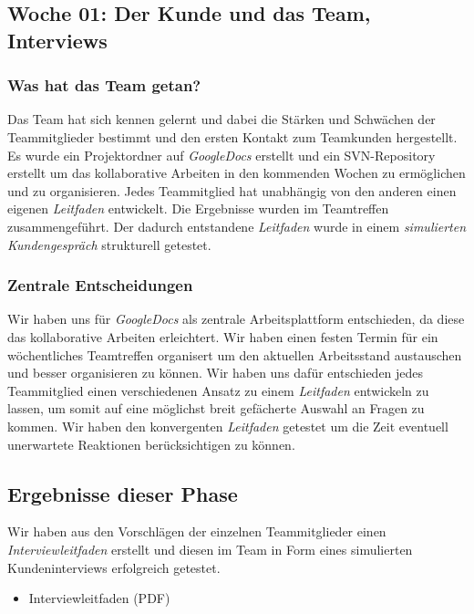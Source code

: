 \documentclass{article}
\begin{document}
\subsection{Woche 01: Der Kunde und das Team, Interviews}

\subsubsection{Was hat das Team getan?}

Das Team hat sich kennen gelernt und dabei die St\"arken und Schw\"achen der Teammitglieder bestimmt und den ersten Kontakt zum Teamkunden hergestellt. Es wurde ein Projektordner auf \textit{GoogleDocs} erstellt und ein SVN-Repository erstellt um das kollaborative Arbeiten in den kommenden Wochen zu erm\"oglichen und zu organisieren. Jedes Teammitglied hat unabh\"angig von den anderen einen eigenen \textit{Leitfaden} entwickelt. Die Ergebnisse wurden im Teamtreffen zusammengef\"uhrt. Der dadurch entstandene \textit{Leitfaden} wurde in einem \textit{simulierten Kundengespr\"ach} strukturell getestet.

\subsubsection{Zentrale Entscheidungen}

Wir haben uns f\"ur \textit{GoogleDocs} als zentrale Arbeitsplattform entschieden, da diese das kollaborative Arbeiten erleichtert. Wir haben einen festen Termin f\"ur ein w\"ochentliches Teamtreffen organisert um den aktuellen Arbeitsstand austauschen und besser organisieren zu k\"onnen. Wir haben uns daf\"ur entschieden jedes Teammitglied einen verschiedenen Ansatz zu einem \textit{Leitfaden} entwickeln zu lassen, um somit auf eine m\"oglichst breit gef\"acherte Auswahl an Fragen zu kommen. Wir haben den konvergenten \textit{Leitfaden} getestet um die Zeit eventuell unerwartete Reaktionen ber\"ucksichtigen zu k\"onnen.

\subsection{Ergebnisse dieser Phase}

Wir haben aus den Vorschl\"agen der einzelnen Teammitglieder einen \textit{Interviewleitfaden} erstellt und diesen im Team in Form eines simulierten Kundeninterviews erfolgreich getestet.

\begin{itemize}
\item Interviewleitfaden (PDF)
\end{itemize}
\end{document}
